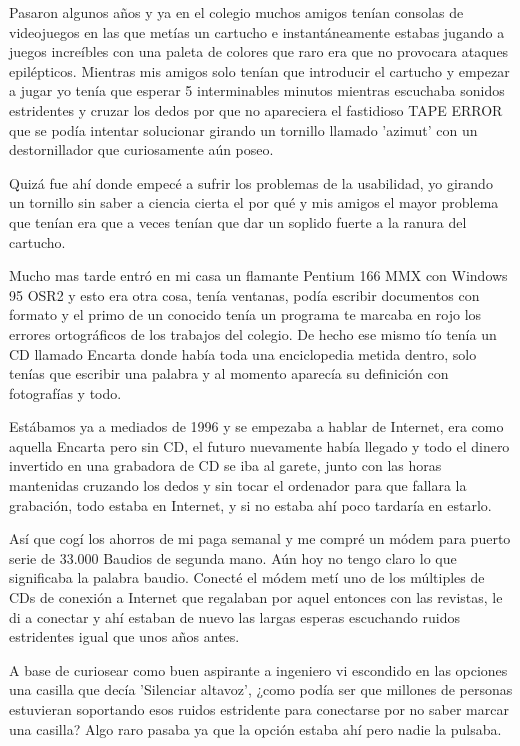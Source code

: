 \bigskip
Pasaron algunos años y ya en el colegio muchos amigos tenían consolas de videojuegos en las que metías un cartucho e instantáneamente estabas jugando a juegos increíbles con una paleta de colores que raro era que no provocara ataques epilépticos. Mientras mis amigos solo tenían que introducir el cartucho y empezar a jugar yo tenía que esperar 5 interminables minutos mientras escuchaba sonidos estridentes y cruzar los dedos por que no apareciera el fastidioso TAPE ERROR que se podía intentar solucionar girando un tornillo llamado 'azimut' con un destornillador que curiosamente aún poseo. 

\bigskip
Quizá fue ahí donde empecé a sufrir los problemas de la usabilidad, yo girando un tornillo sin saber a ciencia cierta el por qué y mis amigos el mayor problema que tenían era que a veces tenían que dar un soplido fuerte a la ranura del cartucho.

\bigskip
Mucho mas tarde entró en mi casa un flamante Pentium 166 MMX con Windows 95 OSR2 y esto era otra cosa, tenía ventanas, podía escribir documentos con formato y el primo de un conocido tenía un programa te marcaba en rojo los errores ortográficos de los trabajos del colegio. De hecho ese mismo tío tenía un CD llamado Encarta donde había toda una enciclopedia metida dentro, solo tenías que escribir una palabra y al momento aparecía su definición con fotografías y todo.

\bigskip
Estábamos ya a mediados de 1996 y se empezaba a hablar de Internet, era como aquella Encarta pero sin CD, el futuro nuevamente había llegado y todo el dinero invertido en una grabadora de CD se iba al garete, junto con las horas mantenidas cruzando los dedos y sin tocar el ordenador para que fallara la grabación, todo estaba en Internet, y si no estaba ahí poco tardaría en estarlo.

\bigskip
Así que cogí los ahorros de mi paga semanal y me compré un módem para puerto serie de 33.000 Baudios de segunda mano. Aún hoy no tengo claro lo que significaba la palabra baudio. Conecté el módem metí uno de los múltiples de CDs de conexión a Internet que regalaban por aquel entonces con las revistas, le di a conectar y ahí estaban de nuevo las largas esperas escuchando ruidos estridentes igual que unos años antes.

\bigskip
A base de curiosear como buen aspirante a ingeniero vi escondido en las opciones una casilla que decía 'Silenciar altavoz', ¿como podía ser que millones de personas estuvieran soportando esos ruidos estridente para conectarse por no saber marcar una casilla? Algo raro pasaba ya que la opción estaba ahí pero nadie la pulsaba.

